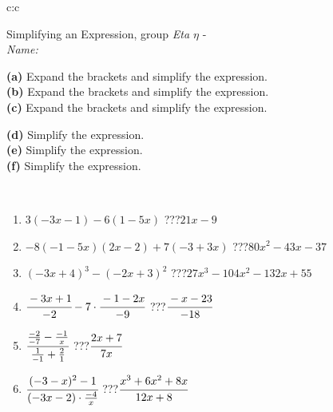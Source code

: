 \documentclass[10pt]{report}
\begin{document}
\newpage
\thispagestyle{empty}
\begin{tabular}{c:c}
\begin{minipage}[c][104.5mm][t]{0.5\linewidth}
\begin{center}
\vspace{7mm}
{\huge Simplifying an Expression, group \textit{Eta $\eta$} -}\\[5mm]
\textit{Name:}\phantom{xxxxxxxxxxxxxxxxxxxxxxxxxxxxxxxxxxxxxxxxxxxxxxxxxxxxxxxxxxxxxxxxx}\\[5mm]
\begin{minipage}{0.95\linewidth}
\begin{center}
{\small \begin{minipage}{0.6\textwidth}
\textbf{(a)} Expand the brackets and simplify the expression. \\[1mm]
\textbf{(b)} Expand the brackets and simplify the expression. \\[1mm]
\textbf{(c)} Expand the brackets and simplify the expression.
\end{minipage} \begin{minipage}{0.39\textwidth}
\textbf{(d)} Simplify the expression. \\[1mm]
\textbf{(e)} Simplify the expression. \\[1mm]
\textbf{(f)} Simplify the expression.
\end{minipage}
}
\end{center}
\end{minipage}
\\[4mm]
\begin{minipage}{0.79\linewidth}
\begin{center}
\begin{varwidth}{\linewidth}
\begin{enumerate}
\normalsize
\item $3(-3x-1)-6(1-5x)$\quad \dotfill\; ???\;\dotfill \quad $21x-9$
\item $-8(-1-5x)(2x-2)+7(-3+3x)$\quad \dotfill\; ???\;\dotfill \quad $80x^2-43x-37$
\item $(-3x+4)^3-(-2x+3)^2$\quad \dotfill\; ???\;\dotfill \quad $27x^3-104x^2-132x+55$
\item $\cfrac{-3x+1}{-2}-7\cdot\cfrac{-1-2x}{-9}$\quad \dotfill\; ???\;\dotfill \quad $\cfrac{-x-23}{-18}$
\item $\cfrac{\frac{-2}{-7}-\frac{-1}{x}}{\frac{1}{-1}+\frac{2}{1}}$\quad \dotfill\; ???\;\dotfill \quad $\cfrac{2x+7}{7x}$
\item $\cfrac{(-3-x)^2-1}{(-3x-2)\cdot\frac{-4}{x}}$\quad \dotfill\; ???\;\dotfill \quad $\cfrac{x^3+6x^2+8x}{12x+8}$

\end{enumerate}
\end{varwidth}
\end{center}
\end{minipage}
\end{center}
\end{minipage}
\end{tabular}
\end{document}
